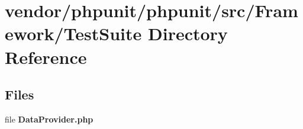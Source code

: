 \section{vendor/phpunit/phpunit/src/\+Framework/\+Test\+Suite Directory Reference}
\label{dir_386824d752b06ef137402b24270ffce8}
\subsection*{Files}
\begin{DoxyCompactItemize}
\item 
file {\bf Data\+Provider.\+php}
\end{DoxyCompactItemize}
